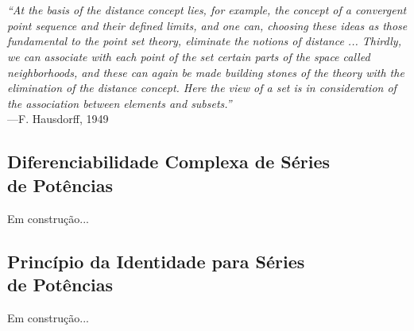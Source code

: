 \chapter[Semana 6]{}
\chaptermark{}


\hfill%
\begin{minipage}{12cm}
	\begin{flushright}
		\rightskip=0.5cm
		\textit{``At the basis of the distance concept lies, for example, 
		the concept of a convergent point sequence and their defined limits,
		and one can, choosing these ideas as those fundamental to the point 
		set theory, eliminate the notions of distance ... Thirdly, 
		we can associate with each point of the set certain parts of the space
		called neighborhoods, and these can again be made building stones of the 
		theory with the elimination of the distance concept. Here the view
		of a set is in consideration of the association between elements and
		subsets.''}
		\\[0.1cm]
		\rightskip=0.5cm
		---F. Hausdorff, 1949
	\end{flushright}
\end{minipage}



\section[Diferenciabilidade Complexa de Séries de Potências]
{Diferenciabilidade Complexa de Séries\\ de Potências}
\begin{center}
Em construção...
\end{center}




\section[Princípio da Identidade para Séries de Potências]
{Princípio da Identidade para Séries\\ de Potências}
\begin{center}
Em construção...
\end{center}


